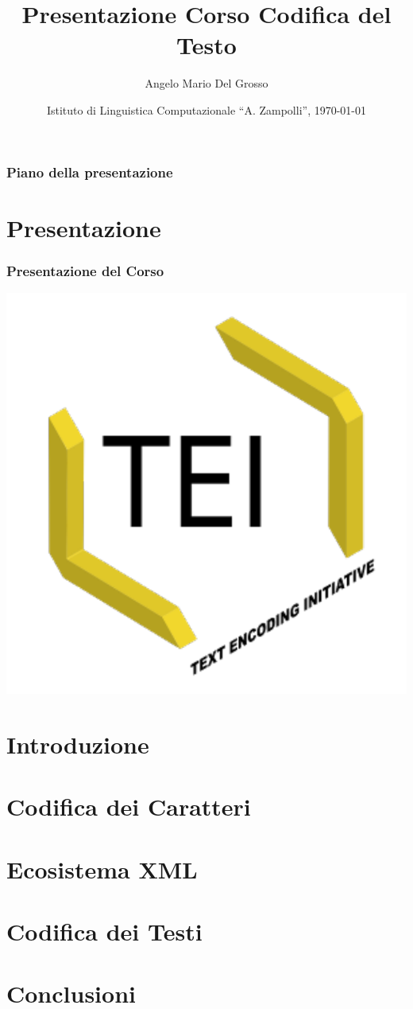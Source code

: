 \documentclass{beamer}
\title{Presentazione Corso Codifica del Testo}
\author[A.M. Del Grosso]{Angelo Mario Del Grosso}
\institute{\texttt{angelo.delgrosso@ilc.cnr.it} \\\bigskip\textit{CNR-ILC-LicoLab} \\\bigskip\url{http://licolab.ilc.cnr.it/}}
\date{Istituto di Linguistica Computazionale ``A. Zampolli'', \today}
\begin{document}
\begin{frame}
	\maketitle
\end{frame}

\begin{frame}
	\frametitle{Piano della presentazione}
	\tableofcontents
\end{frame}

\section{Presentazione}
\begin{frame}
	\frametitle{Presentazione del Corso}
	\addtocounter{nframe}{1}
    
    \begin{center}
	    \includegraphics[width=.5\textwidth]{../imgs/tei-r.pdf}
	\end{center}

    
\end{frame}

\section{Introduzione}


\section{Codifica dei Caratteri}


\section{Ecosistema XML}


\section{Codifica dei Testi}


\section{Conclusioni}

\end{document}

